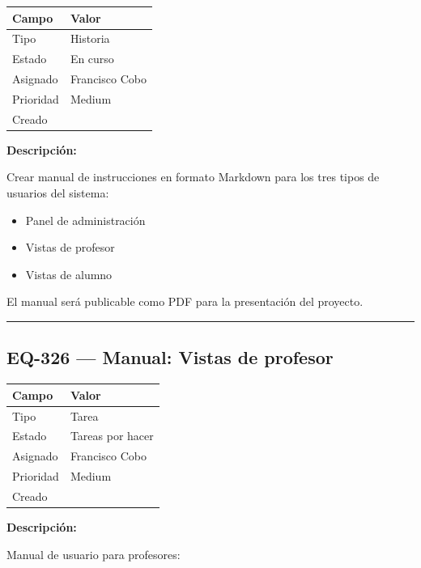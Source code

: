 \documentclass[
  spanish,
  11pt,
]{report}
\newcounter{none} %
\providecommand{\tightlist}{%
  \setlength{\itemsep}{0pt}\setlength{\parskip}{0pt}}
\begin{document}
{\def\LTcaptype{none} %
\begin{longtable}[]{@{}ll@{}}
\toprule\noalign{}
Campo & Valor \\
\midrule\noalign{}
\endhead
\bottomrule\noalign{}
\endlastfoot
Tipo & Historia \\
Estado & En curso \\
Asignado & Francisco Cobo \\
Prioridad & Medium \\
Creado & \\
\end{longtable}
}

\textbf{Descripción:}

Crear manual de instrucciones en formato Markdown para los tres tipos de
usuarios del sistema:

\begin{itemize}
\tightlist
\item
  Panel de administración
\item
  Vistas de profesor
\item
  Vistas de alumno
\end{itemize}

El manual será publicable como PDF para la presentación del proyecto.

\begin{center}\rule{0.5\linewidth}{0.5pt}\end{center}

\subsection{EQ-326 --- Manual: Vistas de
profesor}\label{eq-326-manual-vistas-de-profesor}

{\def\LTcaptype{none} %
\begin{longtable}[]{@{}ll@{}}
\toprule\noalign{}
Campo & Valor \\
\midrule\noalign{}
\endhead
\bottomrule\noalign{}
\endlastfoot
Tipo & Tarea \\
Estado & Tareas por hacer \\
Asignado & Francisco Cobo \\
Prioridad & Medium \\
Creado & \\
\end{longtable}
}

\textbf{Descripción:}

Manual de usuario para profesores:
\end{document}
